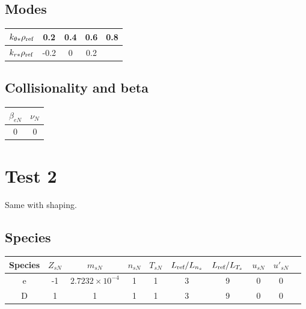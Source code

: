 \documentclass[fleqn]{report}
\begin{document}
\subsection{Modes}
\begin{tabular}{c c c c c}
\hline
$k_{\theta*}\rho_{\textrm{ref}}$ & 0.2 & 0.4 & 0.6 & 0.8 \\ [0.5ex]
\hline
$k_{r*}\rho_{\textrm{ref}}$ & -0.2 & 0  & 0.2  &  \\ [0.5ex]
\hline
\end{tabular}

\subsection{Collisionality and beta}
\begin{tabular}{c c}
\hline
 $\beta_{eN}$ & $\nu_N$ \\ [0.5ex]
\hline
0 & 0 \\ [0.5ex]
\hline
\end{tabular}

\section{Test 2}
Same with shaping.

\subsection{Species}
\begin{tabular}{c c c c c c c c c c}
\hline
Species & $Z_{sN}$ & $m_{sN}$ & $n_{sN}$ & $T_{sN}$ & $L_{\textrm{ref}}/L_{n_s}$ & $L_{\textrm{ref}}/L_{T_s}$ & $u_{sN}$ & $u'_{sN}$ \\ [0.5ex]
\hline
e & -1 & $2.7232\times10^{-4}$ & 1 & 1 & 3 & 9 & 0 & 0 \\ [0.5ex]
\hline 
D &  1 & 1 & 1 & 1 & 3 & 9 & 0 & 0 \\ [0.5ex]
\hline
\end{tabular}
\end{document}
